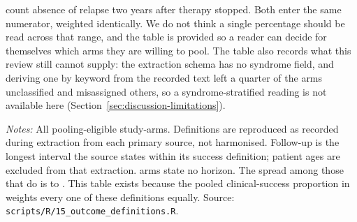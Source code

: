 count absence of relapse two years after therapy stopped. Both enter the same numerator, weighted identically. We do not think a single percentage should be read across that range, and the table is provided so a reader can decide for themselves which arms they are willing to pool. The table also records what this review still cannot supply: the extraction schema has no syndrome field, and deriving one by keyword from the recorded text left a quarter of the arms unclassified and misassigned others, so a syndrome-stratified reading is not available here (Section~\ref{sec:discussion-limitations}).



\begin{table}[htbp]
\centering
\scriptsize
\begin{threeparttable}
\caption{Clinical-success definitions and follow-up horizons, by study-arm}\label{tab:outcome-definitions}

\begin{tablenotes}\footnotesize
\item \textit{Notes:} All \ArmsAnalysed pooling-eligible study-arms. Definitions are reproduced as recorded during extraction from each primary source, not harmonised. Follow-up is the longest interval the source states within its success definition; patient ages are excluded from that extraction. \FollowUpNotStated arms state no horizon. The spread among those that do is \FollowUpMin to \FollowUpMax . This table exists because the pooled clinical-success proportion in  weights every one of these definitions equally. Source: \texttt{scripts/R/15\_outcome\_definitions.R}.
\end{tablenotes}
\end{threeparttable}
\end{table}

